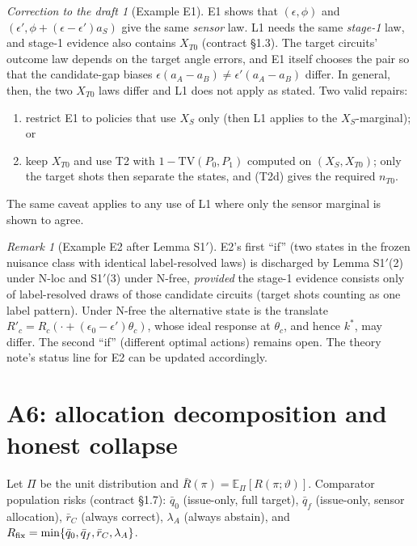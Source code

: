 \documentclass[11pt,a4paper]{article}
\theoremstyle{definition}
\theoremstyle{remark}
\newtheorem{remark}[theorem]{Remark}
\newtheorem*{correction}{Correction to the draft}
\newcommand{\E}{\mathbb{E}}
\newcommand{\vt}{\vartheta}
\newcommand{\lA}{\lambda_A}
\newcommand{\TV}{\mathrm{TV}}
\begin{document}
\begin{correction}[Example E1]
E1 shows that $(\epsilon,\phi)$ and $(\epsilon',\phi+(\epsilon-\epsilon')a_S)$ give the
same \emph{sensor} law. L1 needs the same \emph{stage-1} law, and stage-1 evidence also
contains $X_{T0}$ (contract §1.3). The target circuits' outcome law depends on the target
angle errors, and E1 itself chooses the pair so that the candidate-gap biases
$\epsilon(a_A-a_B)\neq\epsilon'(a_A-a_B)$ differ. In general, then, the two $X_{T0}$ laws
differ and L1 does not apply as stated. Two valid repairs:
\begin{enumerate}[nosep]
\item restrict E1 to policies that use $X_S$ only (then L1 applies to the
$X_S$-marginal); or
\item keep $X_{T0}$ and use T2 with $1-\TV(P_0,P_1)$ computed on $(X_S,X_{T0})$; only the
target shots then separate the states, and (T2d) gives the required $n_{T0}$.
\end{enumerate}
The same caveat applies to any use of L1 where only the sensor marginal is shown to agree.
\end{correction}

\begin{remark}[Example E2 after Lemma S1$'$]
E2's first ``if'' (two states in the frozen nuisance class with identical label-resolved
laws) is discharged by Lemma S1$'$(2) under N-loc and S1$'$(3) under N-free, \emph{provided}
the stage-1 evidence consists only of label-resolved draws of those candidate circuits
(target shots counting as one label pattern). Under N-free the alternative state is the
translate $R'_c=R_c(\cdot+(\epsilon_0-\epsilon')\theta_c)$, whose ideal response at
$\theta_c$, and hence $k^*$, may differ. The second ``if'' (different optimal actions)
remains open. The theory note's status line for E2 can be updated accordingly.
\end{remark}

\section{A6: allocation decomposition and honest collapse}

Let $\Pi$ be the unit distribution and $\bar R(\pi)=\E_\Pi[R(\pi;\vt)]$. Comparator
population risks (contract §1.7): $\bar q_0$ (issue-only, full target), $\bar q_f$
(issue-only, sensor allocation), $\bar r_C$ (always correct), $\lA$ (always abstain), and
$R_{\rm fix}=\min\{\bar q_0,\bar q_f,\bar r_C,\lA\}$.
\end{document}
